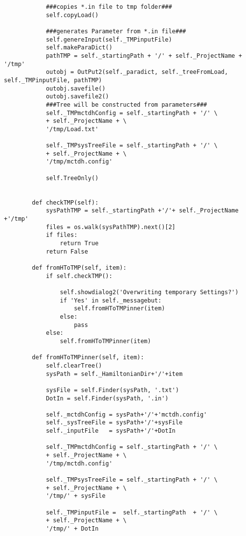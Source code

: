 \begin{verbatim}
            ###copies *.in file to tmp folder###
            self.copyLoad()
    
            ###generates Parameter from *.in file###
            self.genereInput(self._TMPinputFile)
            self.makeParaDict()
            pathTMP = self._startingPath + '/' + self._ProjectName + '/tmp'
            outobj = OutPut2(self._paradict, self._treeFromLoad, self._TMPinputFile, pathTMP)
            outobj.savefile()
            outobj.savefile2()
            ###Tree will be constructed from parameters###
            self._TMPmctdhConfig = self._startingPath + '/' \
            + self._ProjectName + \
            '/tmp/Load.txt'
    
            self._TMPsysTreeFile = self._startingPath + '/' \
            + self._ProjectName + \
            '/tmp/mctdh.config'
    
            self.TreeOnly()
                
    
        def checkTMP(self):
            sysPathTMP = self._startingPath +'/'+ self._ProjectName +'/tmp'
            files = os.walk(sysPathTMP).next()[2]
            if files:
                return True
            return False
    
        def fromHToTMP(self, item):
            if self.checkTMP():
    
                self.showdialog2('Overwriting temporary Settings?')
                if 'Yes' in self._messagebut:
                    self.fromHToTMPinner(item)
                else:
                    pass
            else:
                self.fromHToTMPinner(item)
    
        def fromHToTMPinner(self, item):
            self.clearTree()
            sysPath = self._HamiltonianDir+'/'+item
    
            sysFile = self.Finder(sysPath, '.txt')
            DotIn = self.Finder(sysPath, '.in')
    
            self._mctdhConfig = sysPath+'/'+'mctdh.config'
            self._sysTreeFile = sysPath+'/'+sysFile
            self._inputFile   = sysPath+'/'+DotIn
    
            self._TMPmctdhConfig = self._startingPath + '/' \
            + self._ProjectName + \
            '/tmp/mctdh.config'
    
            self._TMPsysTreeFile = self._startingPath + '/' \
            + self._ProjectName + \
            '/tmp/' + sysFile
    
            self._TMPinputFile =  self._startingPath  + '/' \
            + self._ProjectName + \
            '/tmp/' + DotIn
    

\end{verbatim}
